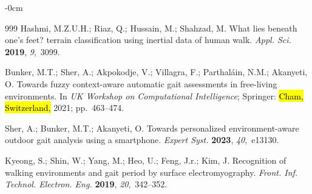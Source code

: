 \documentclass[sensors,article,accept,pdftex,moreauthors]{Definitions/mdpi}
\begin{document}
\begin{adjustwidth}{-\extralength}{0cm}
\begin{thebibliography}{999}
Hashmi, M.Z.U.H.; Riaz, Q.; Hussain, M.; Shahzad, M.
 What lies beneath one’s feet? terrain classification using inertial
  data of human walk.
 {\em Appl. Sci.} {\bf 2019}, {\em 9},~3099.

Bunker, M.T.; Sher, A.; Akpokodje, V.; Villagra, F.; Parthal{\'a}in, N.M.;
  Akanyeti, O.
 Towards fuzzy context-aware automatic gait assessments in free-living
  environments.
 In \emph{UK Workshop on Computational Intelligence};
  Springer: \hl{Cham, Switzerland,} %
 2021; \mbox{pp. 463--474.}

Sher, A.; Bunker, M.T.; Akanyeti, O.
 Towards personalized environment-aware outdoor gait analysis using a
  smartphone.
 {\em Expert Syst.} {\bf 2023}, {\em 40},~e13130.

Kyeong, S.; Shin, W.; Yang, M.; Heo, U.; Feng, J.r.; Kim, J.
 Recognition of walking environments and gait period by surface
  electromyography.
 {\em Front. Inf. Technol. Electron. Eng.}
  {\bf 2019}, {\em 20},~342--352.

\end{thebibliography}

\PublishersNote{}


\end{adjustwidth}
\end{document}

